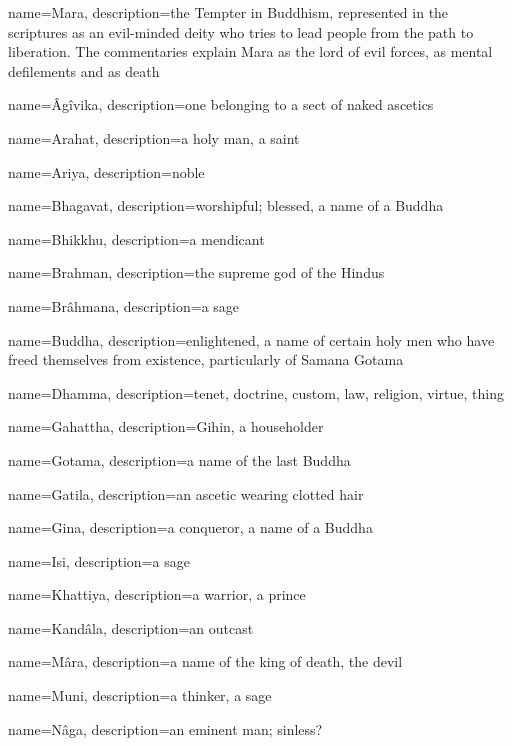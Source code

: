 {
  name=Mara,
  description={the Tempter in Buddhism, represented in the scriptures as an evil-minded deity who tries to lead people from the path to liberation. The commentaries explain Mara as the lord of evil forces, as mental defilements and as death}
}

\newglossaryentry{}
{
  name=Âgîvika,
 description=one belonging to a sect of naked ascetics
}

\newglossaryentry{}
{
  name=Arahat,
 description=a holy man, a saint
}

\newglossaryentry{}
{
  name=Ariya,
 description=noble
}

\newglossaryentry{}
{
  name=Bhagavat,
 description=worshipful; blessed, a name of a Buddha
}

\newglossaryentry{}
{
  name=Bhikkhu,
 description=a mendicant
}

\newglossaryentry{}
{
  name=Brahman,
 description=the supreme god of the Hindus
}

\newglossaryentry{}
{
  name=Brâhmana,
 description=a sage
}

\newglossaryentry{}
{
  name=Buddha,
 description=enlightened, a name of certain holy men who have freed themselves from existence, particularly of Samana Gotama
}

\newglossaryentry{}
{
  name=Dhamma,
 description=tenet, doctrine, custom, law, religion, virtue, thing
}

\newglossaryentry{}
{
  name=Gahattha,
 description=Gihin, a householder
}

\newglossaryentry{}
{
  name=Gotama,
 description=a name of the last Buddha
}

\newglossaryentry{}
{
  name=Gatila,
 description=an ascetic wearing clotted hair
}

\newglossaryentry{}
{
  name=Gina,
 description=a conqueror, a name of a Buddha
}

\newglossaryentry{}
{
  name=Isi,
 description=a sage
}

\newglossaryentry{}
{
  name=Khattiya,
 description=a warrior, a prince
}

\newglossaryentry{}
{
  name=Kandâla,
 description=an outcast
}

\newglossaryentry{}
{
  name=Mâra,
 description=a name of the king of death, the devil
}

\newglossaryentry{}
{
  name=Muni,
 description=a thinker, a sage
}

\newglossaryentry{}
{
  name=Nâga,
 description=an eminent man; sinless?
}

